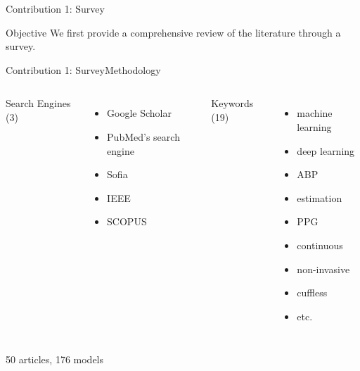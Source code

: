 \begin{frame}{Contribution 1: Survey}
    \begin{block}{Objective}
        We first provide a comprehensive review of the literature through a survey.
    \end{block}
\end{frame}

\begin{frame}{Contribution 1: Survey}{Methodology}
    \begin{columns}
        Search Engines (3)
        \begin{itemize}
            \item Google Scholar
            \item PubMed's search engine
            \item Sofia
            \item IEEE
            \item SCOPUS
        \end{itemize}

        Keywords (19)
        \begin{itemize}
            \item machine learning
            \item deep learning
            \item ABP
            \item estimation
            \item PPG
            \item continuous
            \item non-invasive
            \item cuffless
            \item etc.
        \end{itemize}
    \end{columns}

    \pause
    \vspace{1cm}
    \centering
    \alert{50 articles, 176 models}
\end{frame}

